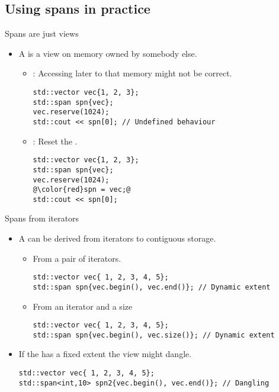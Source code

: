 \subsection{Using spans in practice}

\begin{frame}[t,fragile]{Spans are just views}
\begin{itemize}
  \item A  is a view on memory owned by somebody else.
    \begin{itemize}
      \item {}: Accessing later to that memory might not be correct.
\begin{lstlisting}
std::vector vec{1, 2, 3};
std::span spn{vec};
vec.reserve(1024);
std::cout << spn[0]; // Undefined behaviour
\end{lstlisting}

      \item {}: Reset the .
\begin{lstlisting}[escapechar=@]
std::vector vec{1, 2, 3};
std::span spn{vec};
vec.reserve(1024);
@\color{red}spn = vec;@
std::cout << spn[0];
\end{lstlisting}
    \end{itemize}
\end{itemize}
\end{frame}

\begin{frame}[t,fragile]{Spans from iterators}
\begin{itemize}
  \item A  can be derived from iterators 
        to contiguous storage.
    \begin{itemize}
      \item From a pair of iterators.
\begin{lstlisting}
std::vector vec{ 1, 2, 3, 4, 5};
std::span spn{vec.begin(), vec.end()}; // Dynamic extent
\end{lstlisting}

      \item From an iterator and a size
\begin{lstlisting}
std::vector vec{ 1, 2, 3, 4, 5};
std::span spn{vec.begin(), vec.size()}; // Dynamic extent
\end{lstlisting}
    \end{itemize}

  \item If the  has a fixed extent
        the view might dangle.
\begin{lstlisting}
std::vector vec{ 1, 2, 3, 4, 5};
std::span<int,10> spn2{vec.begin(), vec.end()}; // Dangling
\end{lstlisting}
\end{itemize}
\end{frame}

